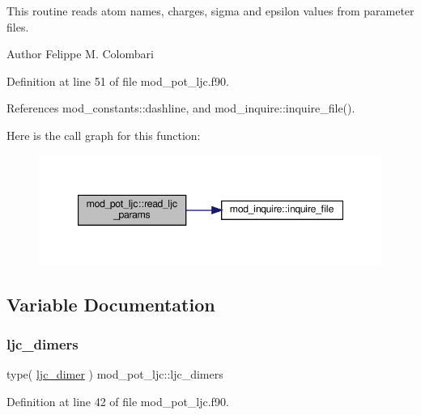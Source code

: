 This routine reads atom names, charges, sigma and epsilon values from parameter files. 

\begin{DoxyAuthor}{Author}
Felippe M. Colombari 
\end{DoxyAuthor}


Definition at line 51 of file mod\+\_\+pot\+\_\+ljc.\+f90.



References mod\+\_\+constants\+::dashline, and mod\+\_\+inquire\+::inquire\+\_\+file().

Here is the call graph for this function\+:
\nopagebreak
\begin{figure}[H]
\begin{center}
\leavevmode
\includegraphics[width=347pt]{namespacemod__pot__ljc_aba75dd17c928cdddf564bf03d18b3ee2_cgraph}
\end{center}
\end{figure}


\subsection{Variable Documentation}
\mbox{\label{namespacemod__pot__ljc_a6c45700ba481536007711306e5c21e0c}} 
\subsubsection{\texorpdfstring{ljc\+\_\+dimers}{ljc\_dimers}}
{\footnotesize\ttfamily type( \hyperlink{structmod__pot__ljc_1_1ljc__dimer}{ljc\+\_\+dimer} ) mod\+\_\+pot\+\_\+ljc\+::ljc\+\_\+dimers}



Definition at line 42 of file mod\+\_\+pot\+\_\+ljc.\+f90.

\mbox{\label{namespacemod__pot__ljc_a1e6c4de2f430e31de30d11b03267a4d9}} 
